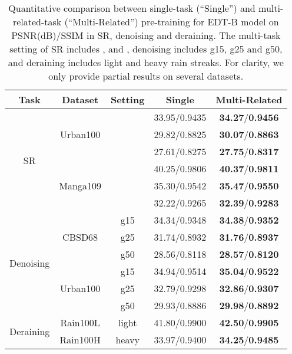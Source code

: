 \documentclass[runningheads]{llncs}
\begin{document}
	\begin{table}[t]
		\caption{Quantitative comparison between single-task (``Single'') and multi-related-task (``Multi-Related'') pre-training for EDT-B model on PSNR(dB)/SSIM in SR, denoising and deraining. The multi-task setting of SR includes ,  and , denoising includes g15, g25 and g50, and deraining includes light and heavy rain streaks. For clarity, we only provide partial results on several datasets.}
		\renewcommand\arraystretch{1.2}
		\setlength\tabcolsep{4pt}
		\begin{center}
\begin{tabular}{| c | c | c | c c |}
				\hline
				Task & Dataset & Setting & Single & Multi-Related \\
				\hline
\multirow{6}{*}{SR} & \multirow{3}{*}{Urban100} &  & 33.95/0.9435 & \textbf{34.27}/\textbf{0.9456} \\
				~ & ~ &  & 29.82/0.8825 & \textbf{30.07}/\textbf{0.8863} \\
				~ & ~ &  & 27.61/0.8275 & \textbf{27.75}/\textbf{0.8317} \\
				\cline{2-5}
				~ & \multirow{3}{*}{Manga109} &  & 40.25/0.9806 & \textbf{40.37}/\textbf{0.9811} \\
				~ & ~ &  & 35.30/0.9542 & \textbf{35.47}/\textbf{0.9550} \\
				~ & ~ &  & 32.22/0.9265 & \textbf{32.39}/\textbf{0.9283} \\
				\hline
				\multirow{6}{*}{Denoising} & \multirow{3}{*}{CBSD68} & g15 & 34.34/0.9348 & \textbf{34.38}/\textbf{0.9352} \\
				~ & ~ & g25 & 31.74/0.8932 & \textbf{31.76}/\textbf{0.8937} \\
				~ & ~ & g50 & 28.56/0.8118 & \textbf{28.57}/\textbf{0.8120} \\
				\cline{2-5}
				~ & \multirow{3}{*}{Urban100} & g15 & 34.94/0.9514 & \textbf{35.04}/\textbf{0.9522} \\
				~ & ~ & g25 & 32.79/0.9298 & \textbf{32.86}/\textbf{0.9307} \\
				~ & ~ & g50 & 29.93/0.8886 & \textbf{29.98}/\textbf{0.8892} \\
				\hline
				\multirow{2}{*}{Deraining} & Rain100L & light & 41.80/0.9900 & \textbf{42.50}/\textbf{0.9905} \\
				\cline{2-5}
				~ & Rain100H & heavy & 33.97/0.9400 & \textbf{34.25}/\textbf{0.9485} \\
				\hline
			\end{tabular}
\end{center}
		\vspace{-0.1in}
		\label{tab:singlevsmulti}
\end{table}
	
\end{document}
